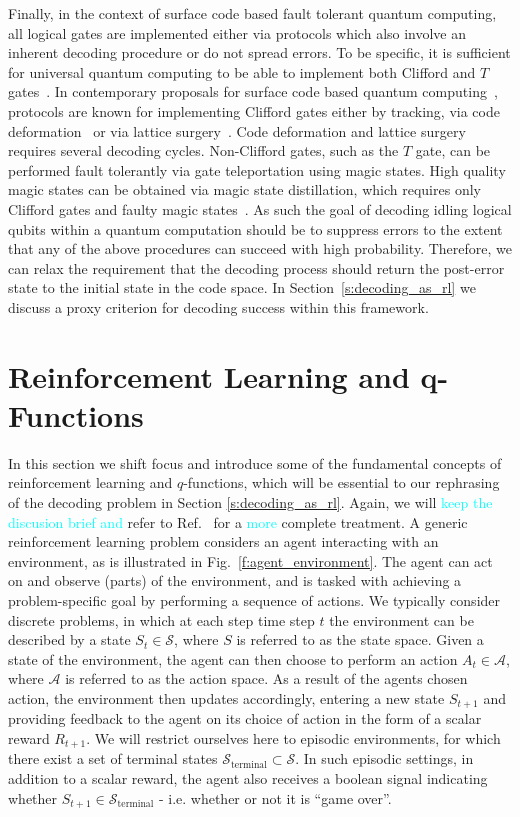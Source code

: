 \documentclass[twocolumn,preprintnumbers,amsmath,amssymb,notitlepage,nofootinbib,longbibliography,superscriptaddress,aps,pra,10pt]{revtex4-1}
\newcommand{\je}[1]{\textcolor{cyan}{#1}}
\begin{document}
	Finally, in the context of surface code based fault tolerant quantum computing, all logical gates are implemented either via protocols which also involve an inherent decoding procedure or do not spread errors.
	To be specific, it is sufficient for universal quantum computing to be able to implement both Clifford and $T$ gates~\cite{Nebe01,Bravyi05}.
	In contemporary proposals for surface code based quantum computing~\cite{Litinski18b,Fowler18}, 
	protocols are known for implementing Clifford gates either by tracking, via code deformation~\cite{Brown17} or via lattice surgery~\cite{Horsman12,Litinski18}.
	Code deformation and lattice surgery requires several decoding cycles.
	Non-Clifford gates, such as the $T$ gate, can be performed fault tolerantly via gate teleportation using magic states.
	High quality magic states can be obtained via magic state distillation, which requires only Clifford gates and faulty magic states~\cite{Bravyi05}.
	As such the goal of decoding idling logical qubits within a quantum computation should be to suppress errors to the extent that any of the above procedures can succeed with high probability.
	Therefore, we can relax the requirement that the decoding process should return the post-error state to the initial state in the code space.
	In Section~\ref{s:decoding_as_rl} we discuss a proxy criterion for decoding success within this framework.

\section{Reinforcement Learning and q-Functions}\label{s:reinforcement_learning}

	In this section we shift focus and introduce some of the fundamental concepts of reinforcement learning and $q$-functions, which will be essential to our rephrasing of the decoding problem in Section \ref{s:decoding_as_rl}.
	Again, we will %
	\je{keep the discusion brief and} refer to Ref.\ \cite{RLSutton18} for a \je{more} complete treatment.
	A generic reinforcement learning problem considers an agent interacting with an environment, as is illustrated in Fig.\ \ref{f:agent_environment}.
	The agent can act on and observe (parts) of the environment, and is tasked with achieving a problem-specific goal by performing a sequence of actions. 
	We typically consider discrete problems, in  which at each step time step $t$ the environment can be described by a state $S_t \in \mathcal{S}$, where $S$ is referred to as the state space.
	Given a state of the environment, the agent can then choose to perform an action $A_t \in \mathcal{A}$, where $\mathcal{A}$ is referred to as the action space.
	As a result of the agents chosen action, the environment then updates accordingly, entering a new state $S_{t+1}$ and providing feedback to the agent on its choice of action in the form of a scalar reward $R_{t+1}$.
	We will restrict ourselves here to episodic environments, for which there exist a set of terminal states $\mathcal{S}_{\mathrm{terminal}} \subset \mathcal{S}$.
	In such episodic settings, in addition to a scalar reward, the agent also receives a boolean signal indicating whether $S_{t+1} \in \mathcal{S}_{\mathrm{terminal}} $ - i.e. whether or not it is ``game over''.
\end{document}
